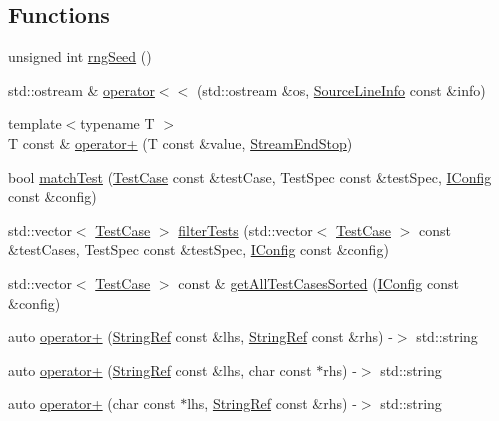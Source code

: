 \subsection*{Functions}
\begin{DoxyCompactItemize}
\item 
unsigned int \mbox{\hyperlink{namespace_catch_acf5ea05e942d2d7fe79111e12754ed76}{rng\+Seed}} ()
\item 
std\+::ostream \& \mbox{\hyperlink{namespace_catch_a6ec18b5054d7fdfdde861c580b082995}{operator$<$$<$}} (std\+::ostream \&os, \mbox{\hyperlink{struct_catch_1_1_source_line_info}{Source\+Line\+Info}} const \&info)
\item 
{\footnotesize template$<$typename T $>$ }\\T const  \& \mbox{\hyperlink{namespace_catch_a5e95b3c47a7618db3649dc39b0bb9004}{operator+}} (T const \&value, \mbox{\hyperlink{struct_catch_1_1_stream_end_stop}{Stream\+End\+Stop}})
\item 
bool \mbox{\hyperlink{namespace_catch_aadef80fbc6bc84589777a462770cef49}{match\+Test}} (\mbox{\hyperlink{class_catch_1_1_test_case}{Test\+Case}} const \&test\+Case, Test\+Spec const \&test\+Spec, \mbox{\hyperlink{struct_catch_1_1_i_config}{I\+Config}} const \&config)
\item 
std\+::vector$<$ \mbox{\hyperlink{class_catch_1_1_test_case}{Test\+Case}} $>$ \mbox{\hyperlink{namespace_catch_ab5da9aa67c42a3f626aea07d0b556829}{filter\+Tests}} (std\+::vector$<$ \mbox{\hyperlink{class_catch_1_1_test_case}{Test\+Case}} $>$ const \&test\+Cases, Test\+Spec const \&test\+Spec, \mbox{\hyperlink{struct_catch_1_1_i_config}{I\+Config}} const \&config)
\item 
std\+::vector$<$ \mbox{\hyperlink{class_catch_1_1_test_case}{Test\+Case}} $>$ const  \& \mbox{\hyperlink{namespace_catch_a1c9b1a23bc947ea70ddaabf067276cf2}{get\+All\+Test\+Cases\+Sorted}} (\mbox{\hyperlink{struct_catch_1_1_i_config}{I\+Config}} const \&config)
\item 
auto \mbox{\hyperlink{namespace_catch_a3a766cb0b8c792c9151baaaf1e8003eb}{operator+}} (\mbox{\hyperlink{class_catch_1_1_string_ref}{String\+Ref}} const \&lhs, \mbox{\hyperlink{class_catch_1_1_string_ref}{String\+Ref}} const \&rhs) -\/$>$ std\+::string
\item 
auto \mbox{\hyperlink{namespace_catch_ab7bdb68d0e4329df79e293f9207b55e9}{operator+}} (\mbox{\hyperlink{class_catch_1_1_string_ref}{String\+Ref}} const \&lhs, char const $\ast$rhs) -\/$>$ std\+::string
\item 
auto \mbox{\hyperlink{namespace_catch_a764a678121fa11c590a53618baa47680}{operator+}} (char const $\ast$lhs, \mbox{\hyperlink{class_catch_1_1_string_ref}{String\+Ref}} const \&rhs) -\/$>$ std\+::string

\end{DoxyCompactItemize}
